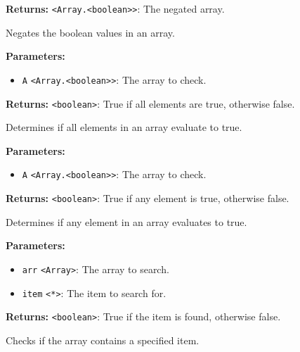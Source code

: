 \documentclass[12pt,a4paper]{article}
\begin{document}
\noindent \textbf{Returns:} \texttt{<Array.<boolean>>}: The negated array.

\noindent Negates the boolean values in an array.

\vspace{5mm}
\noindent {}


\noindent \textbf{Parameters:}
\begin{itemize}
  \item \texttt{A} \texttt{<Array.<boolean>>}: The array to check.
\end{itemize}

\noindent \textbf{Returns:} \texttt{<boolean>}: True if all elements are true, otherwise false.

\noindent Determines if all elements in an array evaluate to true.

\vspace{5mm}
\noindent {}


\noindent \textbf{Parameters:}
\begin{itemize}
  \item \texttt{A} \texttt{<Array.<boolean>>}: The array to check.
\end{itemize}

\noindent \textbf{Returns:} \texttt{<boolean>}: True if any element is true, otherwise false.

\noindent Determines if any element in an array evaluates to true.

\vspace{5mm}
\noindent {}


\noindent \textbf{Parameters:}
\begin{itemize}
  \item \texttt{arr} \texttt{<Array>}: The array to search.
  \item \texttt{item} \texttt{<*>}: The item to search for.
\end{itemize}

\noindent \textbf{Returns:} \texttt{<boolean>}: True if the item is found, otherwise false.

\noindent Checks if the array contains a specified item.
\end{document}
